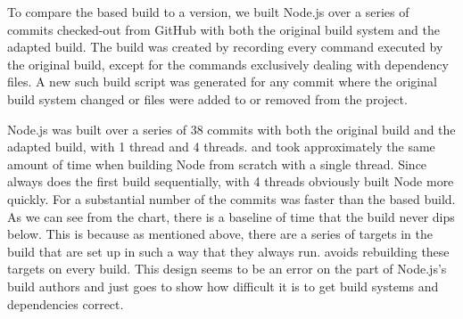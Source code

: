 To compare the \Make based build to a \Rattle version, we built Node.js over a series of commits checked-out from GitHub with both the original build system and the adapted \Rattle build.  The \Rattle build was created by recording every command executed by the original build, except for the commands exclusively dealing with dependency files.  A new such \Rattle build script was generated for any commit where the original build system changed or files were added to or removed from the project.

Node.js was built over a series of 38 commits with both the original \Make build and the adapted \Rattle build, with 1 thread and 4 threads.  \Make and \Rattle took approximately the same amount of time when building Node from scratch with a single thread.  Since \Rattle always does the first build sequentially, with 4 threads \Make obviously built Node more quickly.  For a substantial number of the commits \Rattle was faster than the \Make based build.  As we can see from the chart, there is a baseline of time that the \Make build never dips below.  This is because as mentioned above, there are a series of targets in the \Make build that are set up in such a way that they always run.  \Rattle avoids rebuilding these targets on every build.  This design seems to be an error on the part of Node.js's build authors and just goes to show how difficult it is to get build systems and dependencies correct.





